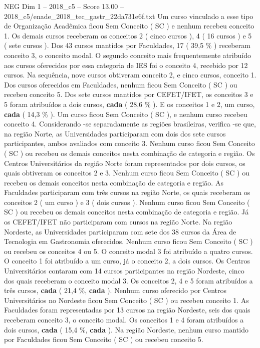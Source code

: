 \begin{textsample}{NEG Dim 1 – 2018\_c5 – Score 13.00 – 2018\_c5/enade\_2018\_tec\_gastr\_22da731e6f.txt}
Um curso vinculado a esse tipo de Organização Acadêmica ficou Sem Conceito ( SC ) e nenhum recebeu conceito 1.
Os demais cursos receberam os conceitos 2 ( cinco cursos ), 4 ( 16 cursos ) e 5 ( sete cursos ).
Dos 43 cursos mantidos por Faculdades, 17 ( 39,5 \% ) receberam conceito 3, o conceito modal.
O segundo conceito mais frequentemente atribuído aos cursos oferecidos por essa categoria de IES foi o conceito 4, recebido por 12 cursos.
Na sequência, nove cursos obtiveram conceito 2, e cinco cursos, conceito 1.
Dos cursos oferecidos em Faculdades, nenhum ficou Sem Conceito ( SC ) ou recebeu conceito 5.
Dos sete cursos mantidos por CEFET/IFET, os conceitos 3 e 5 foram atribuídos a dois cursos, \textbf{cada} ( 28,6 \% ).
E os conceitos 1 e 2, um curso, \textbf{cada} ( 14,3 \% ).
Um curso ficou Sem Conceito ( SC ), e nenhum curso recebeu conceito 4.
Considerando -se separadamente as regiões brasileiras, verifica -se que, na região Norte, as Universidades participaram com dois dos sete cursos participantes, ambos avaliados com conceito 3.
Nenhum curso ficou Sem Conceito ( SC ) ou recebeu os demais conceitos nesta combinação de categoria e região.
Os Centros Universitários da região Norte foram representados por dois cursos, os quais obtiveram os conceitos 2 e 3.
Nenhum curso ficou Sem Conceito ( SC ) ou recebeu os demais conceitos nesta combinação de categoria e região.
As Faculdades participaram com três cursos na região Norte, os quais receberam os conceitos 2 ( um curso ) e 3 ( dois cursos ).
Nenhum curso ficou Sem Conceito ( SC ) ou recebeu os demais conceitos nesta combinação de categoria e região.
Já os CEFET/IFET não participaram com cursos na região Norte.
Na região Nordeste, as Universidades participaram com sete dos 38 cursos da Área de Tecnologia em Gastronomia oferecidos.
Nenhum curso ficou Sem Conceito ( SC ) ou recebeu os conceitos 4 ou 5.
O conceito modal 3 foi atribuído a quatro cursos.
O conceito 1 foi atribuído a um curso, já o conceito 2, a dois cursos.
Os Centros Universitários contaram com 14 cursos participantes na região Nordeste, cinco dos quais receberam o conceito modal 3.
Os conceitos 2, 4 e 5 foram atribuídos a três cursos, \textbf{cada} ( 21,4 \%, \textbf{cada} ).
Nenhum curso oferecido por Centros Universitários no Nordeste ficou Sem Conceito ( SC ) ou recebeu conceito 1.
As Faculdades foram representadas por 13 cursos na região Nordeste, seis dos quais receberam conceito 3, o conceito modal.
Os conceitos 1 e 4 foram atribuídos a dois cursos, \textbf{cada} ( 15,4 \%, \textbf{cada} ).
Na região Nordeste, nenhum curso mantido por Faculdades ficou Sem Conceito ( SC ) ou recebeu conceito 5.

\end{textsample}
